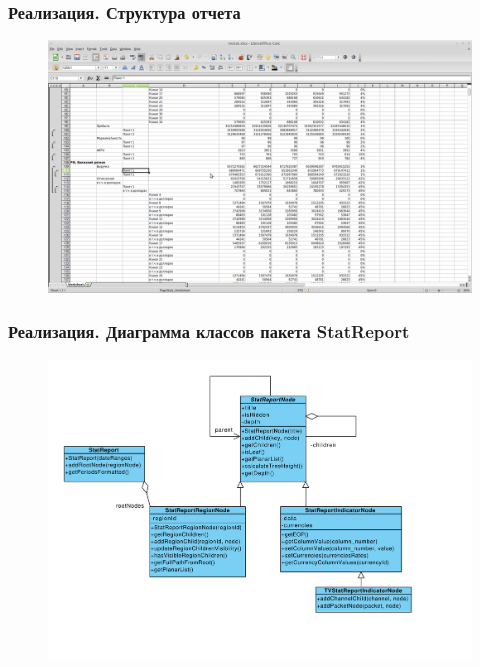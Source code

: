 \documentclass{beamer}
\begin{document}
\begin{frame}
\frametitle{Реализация. Структура отчета}
\begin{figure}
\vspace{-0.5cm}
\hspace*{-1cm} \includegraphics[scale=0.29, trim=5mm 50mm 140mm 60mm, clip]{../resources/report1.png}
\end{figure}
\end{frame}

\begin{frame}[t]
\frametitle{Реализация. Диаграмма классов пакета StatReport}
\begin{figure}
\begin{center}
\vspace{-1cm}
\hspace*{-1cm} \includegraphics[scale=0.43]{../resources/uml/StatReport.pdf}
\end{center}
\end{figure}
\end{frame}
\end{document}

